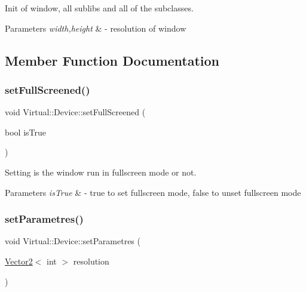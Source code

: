 Init of window, all sublibs and all of the subclasses. 


\begin{DoxyParams}{Parameters}
{\em width,height} & -\/ resolution of window \\
\hline
\end{DoxyParams}


\subsection{Member Function Documentation}
\hypertarget{class_virtual_1_1_device_a7f0a80fead7847616b92d0defad43d96}{}\label{class_virtual_1_1_device_a7f0a80fead7847616b92d0defad43d96} 
\subsubsection{\texorpdfstring{set\+Full\+Screened()}{setFullScreened()}}
{\footnotesize\ttfamily void Virtual\+::\+Device\+::set\+Full\+Screened (\begin{DoxyParamCaption}\item[{bool}]{is\+True }\end{DoxyParamCaption})\hspace{0.3cm}{\ttfamily [protected]}}



Setting is the window run in fullscreen mode or not. 


\begin{DoxyParams}{Parameters}
{\em is\+True} & -\/ true to set fullscreen mode, false to unset fullscreen mode \\
\hline
\end{DoxyParams}
\hypertarget{class_virtual_1_1_device_a15e199ed381e9cf1eea79ce2da30786e}{}\label{class_virtual_1_1_device_a15e199ed381e9cf1eea79ce2da30786e} 
\subsubsection{\texorpdfstring{set\+Parametres()}{setParametres()}}
{\footnotesize\ttfamily void Virtual\+::\+Device\+::set\+Parametres (\begin{DoxyParamCaption}\item[{\hyperlink{struct_virtual_1_1_vector2}{Vector2}$<$ int $>$}]{resolution }\end{DoxyParamCaption})\hspace{0.3cm}{\ttfamily [protected]}}



